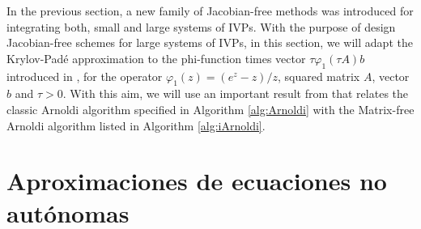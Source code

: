 In the previous section, a new family of Jacobian-free methods was introduced for integrating both, small and large systems of IVPs. With the purpose of design Jacobian-free schemes for large systems of IVPs, in this section, we will adapt the Krylov-Padé approximation to the phi-function times vector $\tau \varphi_1(\tau A)b$ introduced in \cite{Naranjo-Noda21}, for the operator $\varphi_1(z)=(e^z-z)/z$, squared matrix $A$, vector $b$ and $\tau>0$. With this aim, we will use an important result from \cite{brown1987local} that relates the classic Arnoldi algorithm specified in Algorithm \ref{alg:Arnoldi} with the Matrix-free Arnoldi algorithm listed in Algorithm \ref{alg:iArnoldi}.



\section{Aproximaciones de ecuaciones no autónomas}
